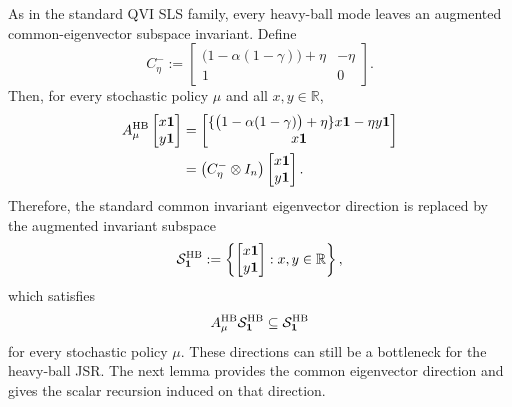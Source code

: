 \documentclass[letterpaper]{article}
\numberwithin{equation}{section}
\newcommand{\R}{\mathbb{R}}
\begin{document}
As in the standard QVI SLS family, every heavy-ball mode leaves an augmented
common-eigenvector subspace invariant. Define
\begin{equation}
  C_\eta^-:=
  \begin{bmatrix}
    \bigl(1-\alpha(1-\gamma)\bigr)+\eta&-\eta\\
    1&0
  \end{bmatrix}.
  \label{eq:common-eigenvector-companion}
\end{equation}
Then, for every stochastic policy $\mu$ and all $x,y\in\R$,
\begin{align*}
  A_\mu^{\rm HB}
  \begin{bmatrix}x\mathbf{1}\\y\mathbf{1}\end{bmatrix}
  &=
  \begin{bmatrix}
    \{\bigl(1-\alpha(1-\gamma)\bigr)+\eta\}x\mathbf{1}-\eta y\mathbf{1}\\
    x\mathbf{1}
  \end{bmatrix}\\
  &=\left(C_\eta^-\otimes I_n\right)
  \begin{bmatrix}x\mathbf{1}\\y\mathbf{1}\end{bmatrix}.
\end{align*}
Therefore, the standard common invariant eigenvector direction is replaced by the
augmented invariant subspace
\begin{equation}
  \mathcal S_{\mathbf{1}}^{\rm HB}
  :=\left\{\begin{bmatrix}x\mathbf{1}\\y\mathbf{1}\end{bmatrix}:x,y\in\R\right\},
  \label{eq:hb-common-eigenvector-subspace}
\end{equation}
which satisfies
\begin{equation}
  A_\mu^{\rm HB}\mathcal S_{\mathbf{1}}^{\rm HB}
  \subseteq \mathcal S_{\mathbf{1}}^{\rm HB}  \label{eq:hb-common-eigenvector-invariance}
\end{equation}
for every stochastic policy $\mu$. These directions can still be a bottleneck for the heavy-ball JSR. The
next lemma provides the common eigenvector direction and gives the scalar recursion induced on that direction.
\end{document}
